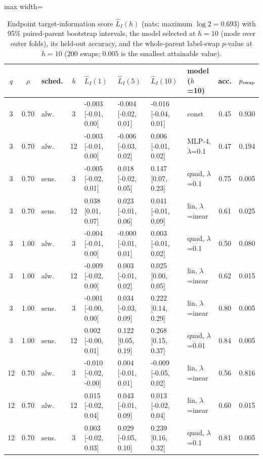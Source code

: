 \documentclass[10pt]{article}
\begin{document}
\begin{table}[htbp]
\centering
\scriptsize
\caption{Endpoint target-information score $\widehat L_I(h)$ (nats; maximum $\log 2=0.693$) with 95\% paired-parent bootstrap intervals, the model selected at $h=10$ (mode over outer folds), its held-out accuracy, and the whole-parent label-swap $p$-value at $h=10$ (200 swaps; $0.005$ is the smallest attainable value).}\label{tab:endpoint}
\begin{adjustbox}{max width=\textwidth}
\begin{tabular}{cclc lll l cc}
\toprule
$q$ & $\rho$ & sched. & $b$ & $\widehat L_I(1)$ & $\widehat L_I(5)$ & $\widehat L_I(10)$ & model ($h$=10) & acc. & $p_{\rm swap}$ \\
\midrule
3 & 0.70 & alw. & 3 & -0.003 [-0.01, 0.00] & -0.004 [-0.02, 0.01] & -0.016 [-0.04, 0.01] & const & 0.45 & 0.930 \\
3 & 0.70 & alw. & 12 & -0.003 [-0.01, 0.00] & -0.006 [-0.03, 0.02] & 0.006 [-0.01, 0.02] & MLP-4, $\lambda$=0.1 & 0.47 & 0.194 \\
3 & 0.70 & sens. & 3 & -0.005 [-0.02, 0.01] & 0.018 [-0.02, 0.05] & 0.147 [0.07, 0.23] & quad, $\lambda$=0.1 & 0.75 & 0.005 \\
3 & 0.70 & sens. & 12 & 0.038 [0.01, 0.07] & 0.023 [-0.01, 0.06] & 0.041 [-0.01, 0.09] & lin, $\lambda$=inear & 0.61 & 0.025 \\
3 & 1.00 & alw. & 3 & -0.004 [-0.01, 0.00] & -0.000 [-0.01, 0.01] & 0.003 [-0.01, 0.02] & quad, $\lambda$=0.1 & 0.50 & 0.080 \\
3 & 1.00 & alw. & 12 & -0.009 [-0.02, 0.00] & 0.003 [-0.01, 0.02] & 0.025 [0.00, 0.05] & lin, $\lambda$=inear & 0.62 & 0.015 \\
3 & 1.00 & sens. & 3 & -0.001 [-0.00, 0.00] & 0.034 [-0.03, 0.09] & 0.222 [0.14, 0.29] & lin, $\lambda$=inear & 0.80 & 0.005 \\
3 & 1.00 & sens. & 12 & 0.002 [-0.00, 0.01] & 0.122 [0.05, 0.19] & 0.268 [0.15, 0.37] & quad, $\lambda$=0.01 & 0.84 & 0.005 \\
12 & 0.70 & alw. & 3 & -0.010 [-0.02, -0.00] & 0.004 [-0.01, 0.01] & -0.009 [-0.05, 0.02] & lin, $\lambda$=inear & 0.56 & 0.816 \\
12 & 0.70 & alw. & 12 & 0.015 [-0.02, 0.04] & 0.043 [-0.01, 0.09] & 0.013 [-0.02, 0.04] & lin, $\lambda$=inear & 0.60 & 0.015 \\
12 & 0.70 & sens. & 3 & 0.003 [-0.02, 0.03] & 0.029 [-0.05, 0.10] & 0.239 [0.16, 0.32] & quad, $\lambda$=0.1 & 0.81 & 0.005 \\

\end{tabular}
\end{adjustbox}
\end{table}
\end{document}
